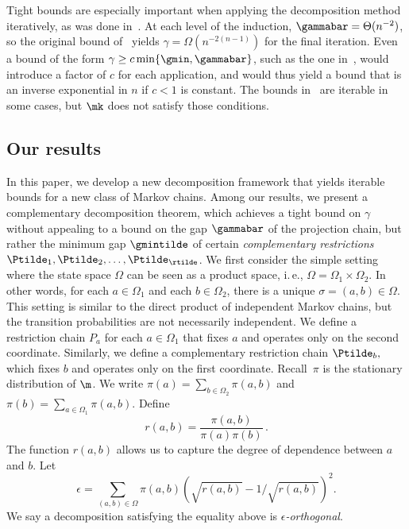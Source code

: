 \documentclass[11pt]{article}
\providecommand{\ie}{i.\,e.}
\begin{document}
Tight bounds are especially important when applying the decomposition 
method iteratively, as was done in~\cite{MS}. At each level of the 
induction, $\gammabar=\Theta(n^{-2})$, so the original bound 
of~\cite{MR00} yields $\gamma=\Omega(n^{-2(n-1)})$ for the final 
iteration.   Even a bound of the form $\gamma \geq c \min\{\gmin, 
\gammabar\}$, such as the one in~\cite{PS17}, would introduce a factor 
of $c$ for each application, and would thus yield a bound that is an 
inverse exponential in $n$ if $c<1$ is constant. The bounds 
in~\cite{jstv04} are iterable in some cases, but $\mk$ does not satisfy 
those conditions.

\subsection{Our results}

In this paper, we develop a new decomposition framework that yields 
iterable bounds for a new class of Markov chains. Among our results, we 
present a complementary decomposition theorem, which achieves a tight 
bound on $\gamma$ without appealing to a bound on the gap $\gammabar$ 
of the projection chain, but rather the minimum gap $\gmintilde$ of 
certain \emph{complementary restrictions} 
$\Ptilde_1,\Ptilde_2,\ldots,\Ptilde_{\rtilde}$. We first consider the 
simple setting where the state space $\Omega$ can be seen as a product 
space, \ie,  $\Omega=\Omega_1\times\Omega_2$. In other words, for each 
$a\in\Omega_1$ and each $b\in\Omega_2$, there is a unique 
$\sigma=(a,b)\in \Omega$. This setting is similar to the direct product 
of independent Markov chains, but the transition probabilities are not 
necessarily independent. We define a restriction chain $P_a$ for each 
$a\in\Omega_1$ that fixes $a$ and operates only on the second 
coordinate.  Similarly, we define a complementary restriction chain 
$\Ptilde_b,$ which fixes $b$ and operates only on the first coordinate. 
Recall~$\pi$ is the stationary distribution of $\m$. We write $\pi(a) = 
\sum_{b\in \Omega_2}\pi(a,b)$ and $\pi(b) = \sum_{a\in 
\Omega_1}\pi(a,b)$.  Define \[r(a,b) = \frac{\pi(a,b)}{\pi(a)\pi(b)}\,.\] 
The function $r(a,b)$ allows us to capture the degree of dependence 
between $a$ and $b$.  Let
\begin{equation}\label{eq:eps}
\epsilon = \sum_{(a,b)\in\Omega}\pi(a,b)\left(\sqrt{r(a,b)} -
1/\sqrt{r(a,b)}\right)^2.
\end{equation}
We say a decomposition satisfying the equality above is \emph{$\epsilon$-orthogonal}. 
%
%
%
%
%
\end{document}
